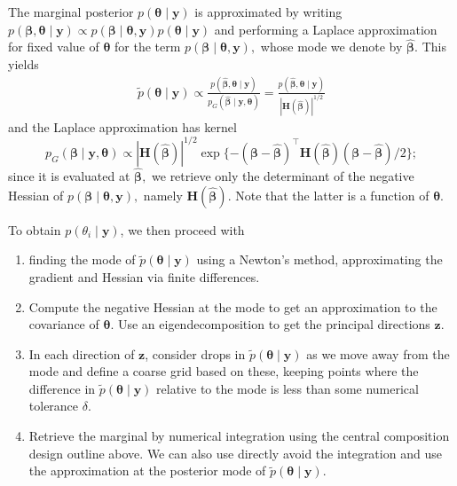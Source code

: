 \documentclass[
  11pt,
  letterpaper,
]{scrbook}
\providecommand{\tightlist}{%
  \setlength{\itemsep}{0pt}\setlength{\parskip}{0pt}}\usepackage{longtable,booktabs,array}
\theoremstyle{definition}
\theoremstyle{definition}
\theoremstyle{definition}
\theoremstyle{plain}
\theoremstyle{plain}
\theoremstyle{plain}
\theoremstyle{remark}
\begin{document}
The marginal posterior \(p(\boldsymbol{\theta} \mid \boldsymbol{y})\) is
approximated by writing
\(p(\boldsymbol{\beta}, \boldsymbol{\theta} \mid \boldsymbol{y}) \propto p(\boldsymbol{\beta} \mid \boldsymbol{\theta}, \boldsymbol{y}) p(\boldsymbol{\theta} \mid \boldsymbol{y})\)
and performing a Laplace approximation for fixed value of
\(\boldsymbol{\theta}\) for the term
\(p(\boldsymbol{\beta} \mid \boldsymbol{\theta}, \boldsymbol{y}),\)
whose mode we denote by \(\widehat{\boldsymbol{\beta}}.\) This yields
\begin{align*}
\widetilde{p}(\boldsymbol{\theta} \mid \boldsymbol{y}) \propto \frac{p(\widehat{\boldsymbol{\beta}}, \boldsymbol{\theta} \mid \boldsymbol{y})}{ p_{G}(\widehat{\boldsymbol{\beta}} \mid \boldsymbol{y}, \boldsymbol{\theta})} = \frac{p(\widehat{\boldsymbol{\beta}}, \boldsymbol{\theta} \mid \boldsymbol{y})}{ |\mathbf{H}(\widehat{\boldsymbol{\beta}})|^{1/2}}
\end{align*} and the Laplace approximation has kernel
\[p_{G}(\boldsymbol{\beta} \mid \boldsymbol{y}, \boldsymbol{\theta}) \propto |\mathbf{H}(\widehat{\boldsymbol{\beta}})|^{1/2}\exp\{-(\boldsymbol{\beta}- \widehat{\boldsymbol{\beta}})^\top \mathbf{H}(\widehat{\boldsymbol{\beta}})(\boldsymbol{\beta}- \widehat{\boldsymbol{\beta}})/2\};\]
since it is evaluated at \(\widehat{\boldsymbol{\beta}},\) we retrieve
only the determinant of the negative Hessian of
\(p(\boldsymbol{\beta} \mid \boldsymbol{\theta}, \boldsymbol{y}),\)
namely \(\mathbf{H}(\widehat{\boldsymbol{\beta}}).\) Note that the
latter is a function of \(\boldsymbol{\theta}.\)

To obtain \(p(\theta_i \mid \boldsymbol{y})\), we then proceed with

\begin{enumerate}
\def\labelenumi{\arabic{enumi}.}
\tightlist
\item
  finding the mode of
  \(\widetilde{p}(\boldsymbol{\theta} \mid \boldsymbol{y})\) using a
  Newton's method, approximating the gradient and Hessian via finite
  differences.
\item
  Compute the negative Hessian at the mode to get an approximation to
  the covariance of \(\boldsymbol{\theta}.\) Use an eigendecomposition
  to get the principal directions \(\boldsymbol{z}\).
\item
  In each direction of \(\boldsymbol{z}\), consider drops in
  \(\widetilde{p}(\boldsymbol{\theta} \mid \boldsymbol{y})\) as we move
  away from the mode and define a coarse grid based on these, keeping
  points where the difference in
  \(\widetilde{p}(\boldsymbol{\theta} \mid \boldsymbol{y})\) relative to
  the mode is less than some numerical tolerance \(\delta.\)
\item
  Retrieve the marginal by numerical integration using the central
  composition design outline above. We can also use directly avoid the
  integration and use the approximation at the posterior mode of
  \(\widetilde{p}(\boldsymbol{\theta} \mid \boldsymbol{y}).\)
\end{enumerate}
\end{document}
